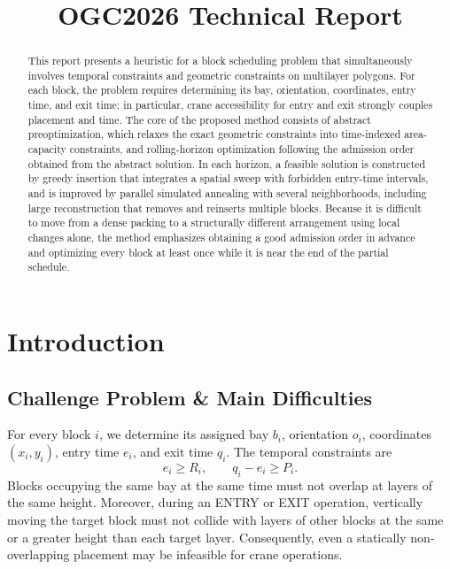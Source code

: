 \documentclass[runningheads]{llncs}
\begin{document}
\title{OGC2026 Technical Report}
\maketitle

\begin{abstract}
This report presents a heuristic for a block scheduling problem that simultaneously involves temporal constraints and geometric constraints on multilayer polygons. For each block, the problem requires determining its bay, orientation, coordinates, entry time, and exit time; in particular, crane accessibility for entry and exit strongly couples placement and time. The core of the proposed method consists of abstract preoptimization, which relaxes the exact geometric constraints into time-indexed area-capacity constraints, and rolling-horizon optimization following the admission order obtained from the abstract solution. In each horizon, a feasible solution is constructed by greedy insertion that integrates a spatial sweep with forbidden entry-time intervals, and is improved by parallel simulated annealing with several neighborhoods, including large reconstruction that removes and reinserts multiple blocks. Because it is difficult to move from a dense packing to a structurally different arrangement using local changes alone, the method emphasizes obtaining a good admission order in advance and optimizing every block at least once while it is near the end of the partial schedule.
\end{abstract}

\section{Introduction}

\subsection{Challenge Problem \& Main Difficulties}

For every block $i$, we determine its assigned bay $b_i$, orientation $o_i$, coordinates $(x_i,y_i)$, entry time $e_i$, and exit time $q_i$. The temporal constraints are
\begin{equation}
e_i\ge R_i,\qquad q_i-e_i\ge P_i.
\end{equation}
Blocks occupying the same bay at the same time must not overlap at layers of the same height. Moreover, during an ENTRY or EXIT operation, vertically moving the target block must not collide with layers of other blocks at the same or a greater height than each target layer. Consequently, even a statically non-overlapping placement may be infeasible for crane operations.
\end{document}
